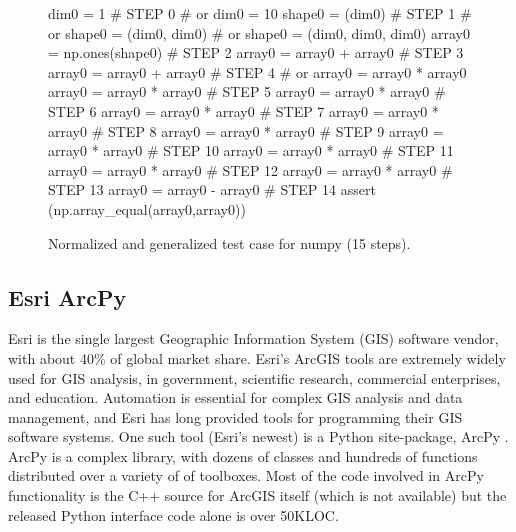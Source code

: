 \begin{figure}
{\scriptsize
\begin{code}
dim0 = 1                            \textcolor{black!60}{\# STEP 0}
\textcolor{black!60}{\#  or dim0 = 10 }
shape0 = (dim0)                     \textcolor{black!60}{\# STEP 1}
\textcolor{black!60}{\#  or shape0 = (dim0, dim0) }
\textcolor{black!60}{\#  or shape0 = (dim0, dim0, dim0) }
array0 = np.ones(shape0)            \textcolor{black!60}{\# STEP 2}
array0 = array0 + array0            \textcolor{black!60}{\# STEP 3}
array0 = array0 + array0            \textcolor{black!60}{\# STEP 4}
\textcolor{black!60}{\#  or array0 = array0 * array0 }
array0 = array0 * array0            \textcolor{black!60}{\# STEP 5}
array0 = array0 * array0            \textcolor{black!60}{\# STEP 6}
array0 = array0 * array0            \textcolor{black!60}{\# STEP 7}
array0 = array0 * array0            \textcolor{black!60}{\# STEP 8}
array0 = array0 * array0            \textcolor{black!60}{\# STEP 9}
array0 = array0 * array0            \textcolor{black!60}{\# STEP 10}
array0 = array0 * array0            \textcolor{black!60}{\# STEP 11}
array0 = array0 * array0            \textcolor{black!60}{\# STEP 12}
array0 = array0 * array0            \textcolor{black!60}{\# STEP 13}
array0 = array0 - array0            \textcolor{black!60}{\# STEP 14}
assert (np.array\_equal(array0,array0))
\end{code}
}
\caption{Normalized and generalized test case for numpy (15 steps).}
\label{numpynormgen}
\end{figure}

\subsection{Esri ArcPy}

Esri is the single
largest Geographic Information System (GIS) software vendor, with about 40\%
of global market share.  Esri's ArcGIS tools are extremely widely
used for GIS analysis, in government, scientific research, commercial
enterprises, and education.  Automation is essential for complex GIS analysis and
data management, and Esri has long provided tools
for programming their GIS software systems.  One such tool
(Esri's newest) is a Python site-package, ArcPy \cite{ArcPy}.  ArcPy is a complex library,
with dozens of classes and hundreds of functions distributed over
a variety of of toolboxes.  Most of the code involved in ArcPy
functionality is the C++ source for ArcGIS itself (which is not
available) but the released Python interface code alone is over 50KLOC.

